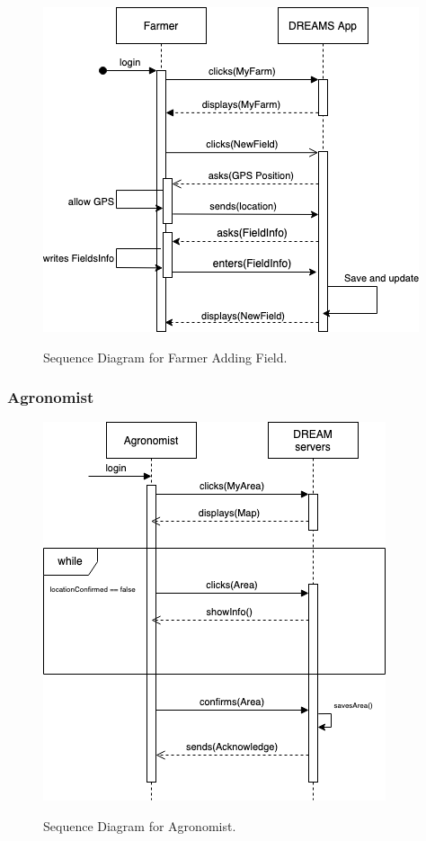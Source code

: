 \begin{figure}[htb!]
\centering
\includegraphics[scale=0.6]{Files/sequence_disgrams/thePNGs/farmer_newField.png}\\
\caption{\label{fig:farmerSeqNewField}Sequence Diagram for Farmer Adding Field.}
\end{figure}

\newpage
\subsubsection{Agronomist}

\begin{figure}[hpt!]
\centering
\includegraphics[scale=0.6]{Files/sequence_disgrams/thePNGs/agronomist_choosingLocation.png}\\
\caption{\label{fig:agrSeqArea}Sequence Diagram for Agronomist.}
\end{figure}

